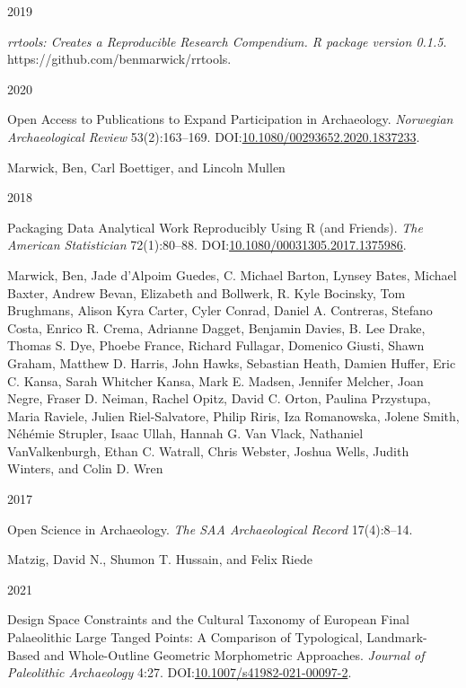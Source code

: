 \documentclass[
  12pt,
  a4paper,
  oneside]{book}
\newlength{\cslhangindent}
\newlength{\csllabelwidth}
\newlength{\cslentryspacingunit} %
\newenvironment{CSLReferences}[2] %
 {%
  \setlength{\parindent}{0pt}
  \ifodd #1
  \let\oldpar\par
  \def\par{\hangindent=\cslhangindent\oldpar}
  \fi
  \setlength{\parskip}{#2\cslentryspacingunit}
 }%
 {}
\newcommand{\CSLBlock}[1]{#1\hfill\break}
\newcommand{\CSLLeftMargin}[1]{\parbox[t]{\csllabelwidth}{#1}}
\newcommand{\CSLRightInline}[1]{\parbox[t]{\linewidth - \csllabelwidth}{#1}\break}
\begin{document}
\begin{CSLReferences}{0}{0}
\leavevmode{}%
\CSLLeftMargin{ 2019 }%
\CSLRightInline{\emph{{rrtools: Creates a Reproducible Research Compendium. R package version 0.1.5}}. https://github.com/benmarwick/rrtools.}

\leavevmode{}%
\CSLLeftMargin{ 2020 }%
\CSLRightInline{{Open Access to Publications to Expand Participation in Archaeology}. \emph{Norwegian Archaeological Review} 53(2):163--169. DOI:\href{https://doi.org/10.1080/00293652.2020.1837233}{10.1080/00293652.2020.1837233}.}

\leavevmode{}%
\CSLBlock{Marwick, Ben, Carl Boettiger, and Lincoln Mullen}
\CSLLeftMargin{ 2018}%
\CSLRightInline{{Packaging Data Analytical Work Reproducibly Using R (and Friends)}. \emph{The American Statistician} 72(1):80--88. DOI:\href{https://doi.org/10.1080/00031305.2017.1375986}{10.1080/00031305.2017.1375986}.}

\leavevmode{}%
\CSLBlock{Marwick, Ben, Jade d'Alpoim Guedes, C. Michael Barton, Lynsey Bates, Michael Baxter, Andrew Bevan, Elizabeth and Bollwerk, R. Kyle Bocinsky, Tom Brughmans, Alison Kyra Carter, Cyler Conrad, Daniel A. Contreras, Stefano Costa, Enrico R. Crema, Adrianne Dagget, Benjamin Davies, B. Lee Drake, Thomas S. Dye, Phoebe France, Richard Fullagar, Domenico Giusti, Shawn Graham, Matthew D. Harris, John Hawks, Sebastian Heath, Damien Huffer, Eric C. Kansa, Sarah Whitcher Kansa, Mark E. Madsen, Jennifer Melcher, Joan Negre, Fraser D. Neiman, Rachel Opitz, David C. Orton, Paulina Przystupa, Maria Raviele, Julien Riel-Salvatore, Philip Riris, Iza Romanowska, Jolene Smith, Néhémie Strupler, Isaac Ullah, Hannah G. Van Vlack, Nathaniel VanValkenburgh, Ethan C. Watrall, Chris Webster, Joshua Wells, Judith Winters, and Colin D. Wren}
\CSLLeftMargin{ 2017}%
\CSLRightInline{{Open Science in Archaeology}. \emph{The SAA Archaeological Record} 17(4):8--14.}

\leavevmode{}%
\CSLBlock{Matzig, David N., Shumon T. Hussain, and Felix Riede}
\CSLLeftMargin{ 2021}%
\CSLRightInline{{Design Space Constraints and the Cultural Taxonomy of European Final Palaeolithic Large Tanged Points: A Comparison of Typological, Landmark-Based and Whole-Outline Geometric Morphometric Approaches}. \emph{Journal of Paleolithic Archaeology} 4:27. DOI:\href{https://doi.org/10.1007/s41982-021-00097-2}{10.1007/s41982-021-00097-2}.}


\end{CSLReferences}
\end{document}
